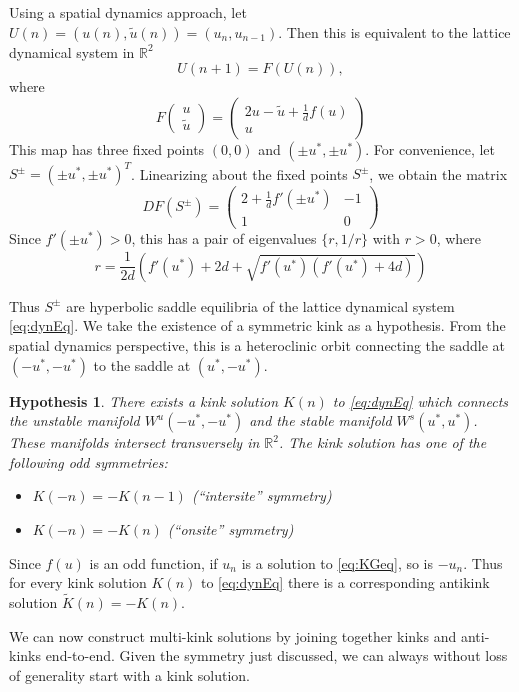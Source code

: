 \documentclass[12pt]{article}
\def\R{{\mathbb R}}
\newtheorem{hypothesis}{Hypothesis}
\begin{document}
Using a spatial dynamics approach, let $U(n) = (u(n), \tilde{u}(n)) = (u_n, u_{n-1})$. Then this is equivalent to the lattice dynamical system in $\R^2$
\begin{equation}\label{eq:dynEq}
U(n+1) = F(U(n)),
\end{equation}
where
\[
F\begin{pmatrix}u \\ \tilde{u} \end{pmatrix} =
\begin{pmatrix}2u - \tilde{u} + \frac{1}{d}f(u) \\
u
\end{pmatrix}
\]
This map has three fixed points $(0,0)$ and $(\pm u^*, \pm u^*)$. For convenience, let $S^\pm = (\pm u^*, \pm u^*)^T$. Linearizing about the fixed points $S^\pm$, we obtain the matrix 
\[
D F(S^\pm)=
\begin{pmatrix}2 + \frac{1}{d}f'(\pm u^*) & -1 \\ 1 & 0
\end{pmatrix}
\]
Since $f'(\pm u^*) > 0$, this has a pair of eigenvalues $\{ r, 1/r \}$ with $r > 0$, where
\[
r = \frac{1}{2d}\left( f'(u^*) + 2d + \sqrt{f'(u^*)(f'(u^*) + 4d)} \right)
\]

Thus $S^\pm$ are hyperbolic saddle equilibria of the lattice dynamical system \cref{eq:dynEq}. We take the existence of a symmetric kink as a hypothesis. From the spatial dynamics perspective, this is a heteroclinic orbit connecting the saddle at $(-u^*, -u^*)$ to the saddle at $(u^*, -u^*)$.

\begin{hypothesis}\label{hyp:kinkexists}
There exists a kink solution $K(n)$ to \cref{eq:dynEq} which connects the unstable manifold $W^u(-u^*, -u^*)$ and the stable manifold $W^s(u^*, u^*)$. These manifolds intersect transversely in $\R^2$. The kink solution has one of the following odd symmetries:
\begin{itemize}
	\item $K(-n) = -K(n-1)$ (``intersite'' symmetry)
	\item $K(-n) = -K(n)$ (``onsite'' symmetry)
\end{itemize}
\end{hypothesis}

Since $f(u)$ is an odd function, if $u_n$ is a solution to \cref{eq:KGeq}, so is $-u_n$. Thus for every kink solution $K(n)$ to \cref{eq:dynEq} there is a corresponding antikink solution $\tilde{K}(n) = -K(n)$.

We can now construct multi-kink solutions by joining together kinks and anti-kinks end-to-end. Given the symmetry just discussed, we can always without loss of generality start with a kink solution.
\end{document}
